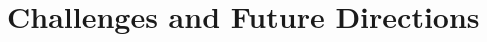 \documentclass[11pt]{article}
\begin{document}


\section{Challenges and Future Directions}
\end{document}
